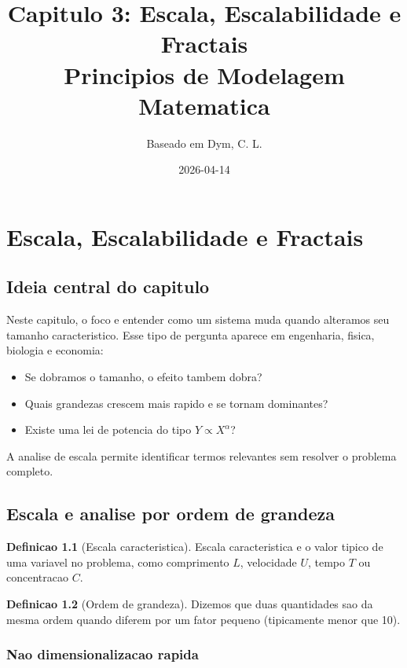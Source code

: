\documentclass[12pt,a4paper,oneside]{book}
\title{\textbf{Capitulo 3: Escala, Escalabilidade e Fractais}\\[0.4cm]
\large Principios de Modelagem Matematica}
\author{Baseado em Dym, C. L.}
\date{2026-04-14}
\theoremstyle{definition}
\newtheorem{definition}{Definicao}[chapter]
\begin{document}
\maketitle
\tableofcontents
\newpage

\chapter{Escala, Escalabilidade e Fractais}

\section{Ideia central do capitulo}

Neste capitulo, o foco e entender como um sistema muda quando alteramos seu tamanho caracteristico.
Esse tipo de pergunta aparece em engenharia, fisica, biologia e economia:

\begin{itemize}
    \item Se dobramos o tamanho, o efeito tambem dobra?
    \item Quais grandezas crescem mais rapido e se tornam dominantes?
    \item Existe uma lei de potencia do tipo $Y \propto X^\alpha$?
\end{itemize}

A analise de escala permite identificar termos relevantes sem resolver o problema completo.

\section{Escala e analise por ordem de grandeza}

\begin{definition}[Escala caracteristica]
Escala caracteristica e o valor tipico de uma variavel no problema, como comprimento $L$, velocidade $U$, tempo $T$ ou concentracao $C$.
\end{definition}

\begin{definition}[Ordem de grandeza]
Dizemos que duas quantidades sao da mesma ordem quando diferem por um fator pequeno (tipicamente menor que 10).
\end{definition}

\subsection{Nao dimensionalizacao rapida}
\end{document}
